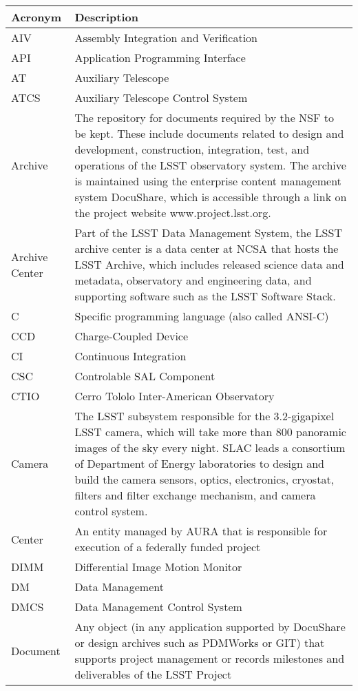 \addtocounter{table}{-1}
\begin{longtable}{|l|p{}|}\hline
\textbf{Acronym} & \textbf{Description}  \\\hline

AIV & Assembly Integration and Verification \\\hline
API & Application Programming Interface \\\hline
AT & Auxiliary Telescope \\\hline
ATCS & Auxiliary Telescope Control System \\\hline
Archive & The repository for documents required by the NSF to be kept. These include documents related to design and development, construction, integration, test, and operations of the LSST observatory system. The archive is maintained using the enterprise content management system DocuShare, which is accessible through a link on the project website www.project.lsst.org. \\\hline
Archive Center & Part of the LSST Data Management System, the LSST archive center is a data center at NCSA that hosts the LSST Archive, which includes released science data and metadata, observatory and engineering data, and supporting software such as the LSST Software Stack. \\\hline
C & Specific programming language (also called ANSI-C) \\\hline
CCD & Charge-Coupled Device \\\hline
CI & Continuous Integration \\\hline
CSC & Controlable SAL Component \\\hline
CTIO & Cerro Tololo Inter-American Observatory \\\hline
Camera & The LSST subsystem responsible for the 3.2-gigapixel LSST camera, which will take more than 800 panoramic images of the sky every night. SLAC leads a consortium of Department of Energy laboratories to design and build the camera sensors, optics, electronics, cryostat, filters and filter exchange mechanism, and camera control system. \\\hline
Center & An entity managed by AURA that is responsible for execution of a federally funded project \\\hline
DIMM & Differential Image Motion Monitor \\\hline
DM & Data Management \\\hline
DMCS & Data Management Control System \\\hline
Document & Any object (in any application supported by DocuShare or design archives such as PDMWorks or GIT) that supports project management or records milestones and deliverables of the LSST Project \\\hline

\end{longtable}
